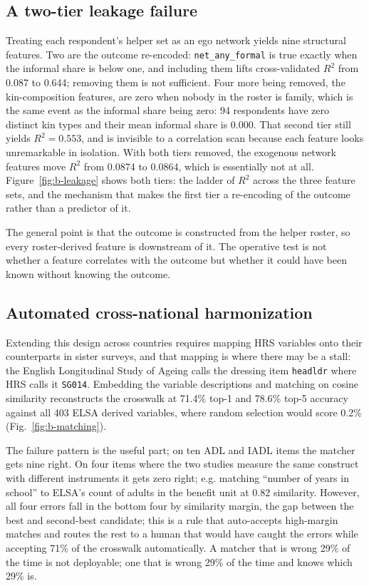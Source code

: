 \documentclass[9pt,twoside]{pnas-new}
\begin{document}
\subsection*{A two-tier leakage failure}

Treating each respondent's helper set as an ego network yields nine structural
features. Two are the outcome re-encoded: \texttt{net\_any\_formal} is true
exactly when the informal share is below one, and including them lifts
cross-validated $R^2$ from 0.087 to 0.644; removing them is not sufficient.
Four more being removed, the kin-composition features, are zero when nobody in the
roster is family, which is the same event as the informal share being zero: 94
respondents have zero distinct kin types and their mean informal share is 0.000. That second tier still yields $R^2 = 0.553$, and is invisible to
a correlation scan because each feature looks unremarkable in isolation. With
both tiers removed, the exogenous network features move $R^2$ from
0.0874 to 0.0864, which is essentially not at all. Figure~\ref{fig:b-leakage} shows both
tiers: the ladder of $R^2$ across the three feature sets, and the mechanism that
makes the first tier a re-encoding of the outcome rather than a predictor of it.

The general point is that the outcome is constructed from the helper
roster, so every roster-derived feature is downstream of it. The operative test
is not whether a feature correlates with the outcome but whether it could have
been known without knowing the outcome.

\subsection*{Automated cross-national harmonization}

Extending this design across countries requires mapping HRS variables onto their
counterparts in sister surveys, and that mapping is where there may be a stall:
the English Longitudinal Study of Ageing calls the dressing item
\texttt{headldr} where HRS calls it \texttt{SG014}. Embedding the variable
descriptions and matching on cosine similarity reconstructs the crosswalk
at 71.4\% top-1 and 78.6\% top-5 accuracy against all 403 ELSA derived
variables, where random selection would score 0.2\%
(Fig.~\ref{fig:b-matching}).

The failure pattern is the useful part; on ten ADL and IADL items the matcher
gets nine right. On four items where the two studies measure the same construct
with different instruments it gets zero right; e.g. matching
``number of years in school'' to ELSA's count of adults in the benefit unit at
0.82 similarity. However, all four errors fall in the bottom four by
similarity margin, the gap between the best and second-best candidate; this is a
rule that auto-accepts high-margin matches and routes the rest to a human that would
have caught the errors while accepting 71\% of the crosswalk automatically. A
matcher that is wrong 29\% of the time is not deployable; one that is wrong 29\%
of the time and knows which 29\% is.
\end{document}
